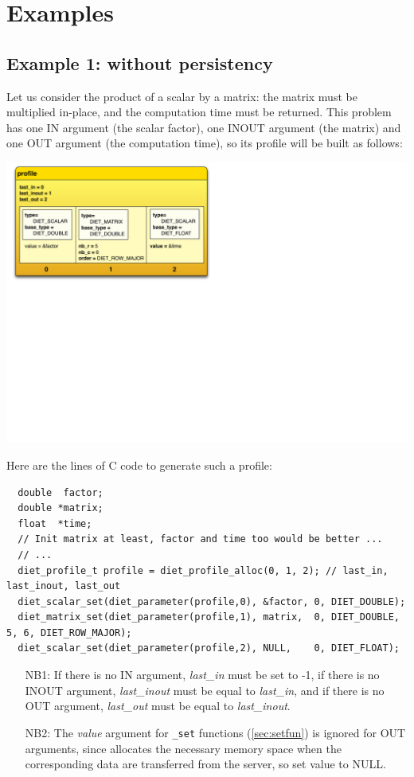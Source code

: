 \section{Examples}
\label{sec:pbex}

\subsection{Example 1: without persistency}
Let us consider the product of a scalar by a matrix: the matrix must be
multiplied in-place, and the computation time must be returned.  This
problem has one IN argument (the scalar factor), one INOUT argument (the matrix)
and one OUT argument (the computation time), so its profile will be built as
follows:
\begin{center}
\includegraphics[scale=.35]{fig/smprod}
\end{center}

Here are the lines of C code to generate such a profile:
{\footnotesize
\begin{verbatim}
  double  factor;
  double *matrix;
  float  *time;
  // Init matrix at least, factor and time too would be better ...
  // ...
  diet_profile_t profile = diet_profile_alloc(0, 1, 2); // last_in, last_inout, last_out
  diet_scalar_set(diet_parameter(profile,0), &factor, 0, DIET_DOUBLE);
  diet_matrix_set(diet_parameter(profile,1), matrix,  0, DIET_DOUBLE, 5, 6, DIET_ROW_MAJOR);
  diet_scalar_set(diet_parameter(profile,2), NULL,    0, DIET_FLOAT);
\end{verbatim}
}

\begin{itemize}
\item[NB1:] If there is no IN argument, \emph{last\_in} must be set to
  -1, if there is no INOUT argument, \emph{last\_inout} must
  be equal to \emph{last\_in}, and if there is no OUT argument,
  \emph{last\_out} must be equal to \emph{last\_inout}.
\item[NB2:] The \emph{value} argument for \texttt{\_set} functions
  (\ref{sec:setfun}) is ignored for OUT arguments, since \diet
  allocates the necessary memory space when the corresponding data are
  transferred from the server, so set value to NULL.
\end{itemize}

